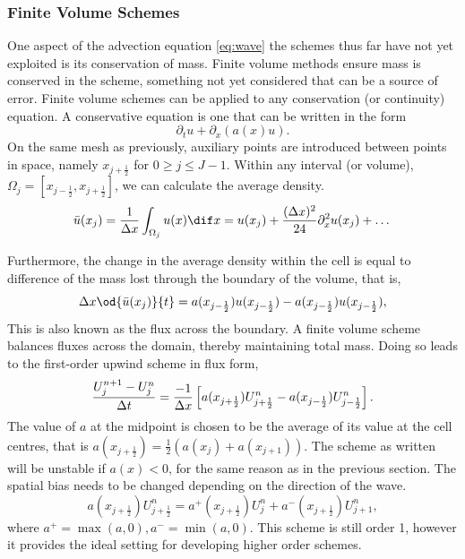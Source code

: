 \subsubsection*{Finite Volume Schemes}
One aspect of the advection equation \eqref{eq:wave} the schemes thus far have not yet exploited is its conservation of mass. Finite volume methods ensure mass is conserved in the scheme, something not yet considered that can be a source of error. Finite volume schemes can be applied to any conservation (or continuity) equation. A conservative equation is one that can be written in the form
\[\partial_t u + \partial_x(a(x) u).\]
On the same mesh as previously, auxiliary points are introduced between points in space, namely $x_{j+\frac{1}{2}}$ for $0\geq j \leq J-1$. Within any interval (or volume), $\Omega_j = \left[x_{j-\frac{1}{2}},x_{j+\frac{1}{2}}\right]$, we can calculate the average density.
\[\bar{u}(x_j) = \frac{1}{\Dx}\int_{\Omega_j} u(x) \dif x = u(x_j) + \frac{(\Dx)^2}{24}\partial^2_x u(x_j) +\dots \]

Furthermore, the change in the average density within the cell is equal to difference of the mass lost through the boundary of the volume, that is,
\[
\Dx\od{\bar{u}(x_j)}{t} = a(x_{j-\frac{1}{2}})u(x_{j-\frac{1}{2}}) - a(x_{j-\frac{1}{2}})u(x_{j-\frac{1}{2}}), 
\]
This is also known as the flux across the boundary. A finite volume scheme balances fluxes across the domain, thereby maintaining total mass. Doing so leads to the first-order upwind scheme in flux form,
\[
\frac{U^{n+1}_j - U^n_j}{\Delta t} = \frac{-1}{\Delta x}\left[ a(x_{j+\frac{1}{2}})U^n_{j+\frac{1}{2}} - a(x_{j-\frac{1}{2}})U^n_{j-\frac{1}{2}}\right].  
\]
The value of $a$ at the midpoint is chosen to be the average of its value at the cell centres, that is $a(x_{j+\frac{1}{2}}) = \frac{1}{2}\left(a(x_j)+a(x_{j+1})\right)$. The scheme as written will be unstable if $a(x)<0$, for the same reason as in the previous section. The spatial bias needs to be changed depending on the direction of the wave. 
\[
a(x_{j+\frac{1}{2}})U^n_{j+\frac{1}{2}} = a^+(x_{j+\frac{1}{2}})U^n_{j} + a^-(x_{j+\frac{1}{2}})U^n_{j+1},
\]
where $a^+ = \max(a,0), a^- = \min(a,0)$.  This scheme is still order 1, however it provides the ideal setting for developing higher order schemes.